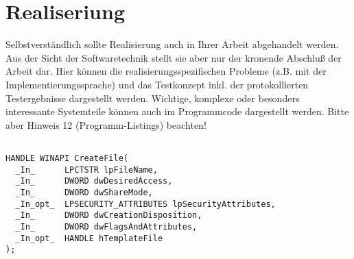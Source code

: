 \chapter{Realiseriung}
Selbstverständlich sollte Realisierung auch in Ihrer Arbeit abgehandelt werden. Aus der Sicht der Softwaretechnik stellt sie aber nur der kronende Abschluß der Arbeit dar. Hier können die realisierungsspezifischen Probleme (z.B. mit der Implementierungssprache) und das Testkonzept inkl. der protokollierten Testergebnisse dargestellt werden. Wichtige, komplexe oder besonders interessante Systemteile können auch im Programmcode dargestellt werden. Bitte aber Hinweis 12 (Programm-Listings) beachten!


\begin{lstlisting}	

HANDLE WINAPI CreateFile(
  _In_      LPCTSTR lpFileName,
  _In_      DWORD dwDesiredAccess,
  _In_      DWORD dwShareMode,
  _In_opt_  LPSECURITY_ATTRIBUTES lpSecurityAttributes,
  _In_      DWORD dwCreationDisposition,
  _In_      DWORD dwFlagsAndAttributes,
  _In_opt_  HANDLE hTemplateFile
);

\end{lstlisting}
